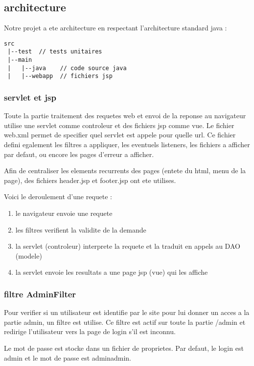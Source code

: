 \subsection{architecture}

Notre projet a ete architecture en respectant l'architecture standard java :
\begin{verbatim}
src
 |--test  // tests unitaires
 |--main
 |   |--java    // code source java
 |   |--webapp  // fichiers jsp
\end{verbatim}

\subsubsection{servlet et jsp}
Toute la partie traitement des requetes web et envoi de la reponse au navigateur utilise une servlet comme controleur et des fichiers jsp comme vue. Le fichier web.xml permet de specifier quel servlet est appele pour quelle url. Ce fichier defini egalement les filtres a appliquer, les eventuels listeners, les fichiers a afficher par defaut, ou encore les pages d'erreur a afficher.

Afin de centraliser les elements recurrents des pages (entete du html, menu de la page), des fichiers header.jsp et footer.jsp ont ete utilises.

Voici le deroulement d'une requete : 
\begin{enumerate}
	\item le navigateur envoie une requete
	\item les filtres verifient la validite de la demande
	\item la servlet (controleur) interprete la requete et la traduit en appels au DAO (modele)
	\item la servlet envoie les resultats a une page jsp (vue) qui les affiche
\end{enumerate}

\subsubsection{filtre AdminFilter}
Pour verifier si un utilisateur est identifie par le site pour lui donner un acces a la partie admin, un filtre est utilise. Ce filtre est actif sur toute la partie /admin et redirige l'utilisateur vers la page de login s'il est inconnu.

Le mot de passe est stocke dans un fichier de proprietes. Par defaut, le login est admin et le mot de passe est adminadmin.

